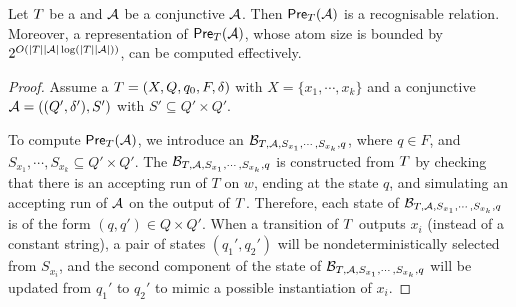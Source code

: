 \begin{lemma}\label{lem-2pt}
Let $T$ be a \PPT{} and $\mathcal{A}$ be a conjunctive \FA{} $\mathcal{A}$. Then $\textsf{Pre}_{T}(\mathcal{A})$ is a recognisable relation. Moreover, a representation of $\textsf{Pre}_{T}(\mathcal{A})$, whose atom size is bounded by $2^{O(|T||\mathcal{A}|\log (|T||\mathcal{A}|))}$, can be computed effectively.
\end{lemma}

\begin{proof}
Assume a \PPT{} $T=(X, Q, q_0, F, \delta)$ with $X = \{x_1,\cdots, x_k\}$ and a conjunctive \FA{} $\mathcal{A} = ((Q', \delta'), S')$ with $S' \subseteq Q' \times Q'$. %

To compute $\textsf{Pre}_{T}(\mathcal{A})$, we introduce an \FA{} $\mathcal{B}_{T, \mathcal{A}, S_{x_1}, \cdots, S_{x_k}, q}$, %
%
where  $q \in F$, and  $S_{x_1}, \cdots, S_{x_k} \subseteq Q' \times Q'$.   
The \FA{} $\mathcal{B}_{T, \mathcal{A}, S_{x_1}, \cdots, S_{x_k}, q}$ is constructed from $T$  by checking that there is an accepting run of $T$ on $w$, ending at the state $q$, and simulating an accepting run of $\mathcal{A}$ on the output of $T$. Therefore, each state of $\mathcal{B}_{T, \mathcal{A}, S_{x_1}, \cdots, S_{x_k}, q}$ is of the form $(q,q') \in Q \times Q'$. 
When a transition of $T$ outputs $x_i$ (instead of a constant string), a pair of states $(q_1', q_2')$ will be nondeterministically selected from $S_{x_i}$, and the second component of the state of $\mathcal{B}_{T, \mathcal{A}, S_{x_1}, \cdots, S_{x_k}, q}$ will be updated from $q_1'$ to $q_2'$ to mimic a possible instantiation of $x_i$.  




\end{proof}
